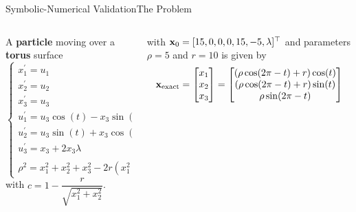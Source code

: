 \begin{frame}{Symbolic-Numerical Validation}{The Problem}
  \begin{columns}
    \begin{column}[t]{0.425\textwidth}
      A \textbf{particle} moving over a \textbf{torus} surface%
      \begin{equation*}
        \label{chap4:eq:torus}
        \begin{cases}
          x^{\prime}_{1} = u_{1} \\
          x^{\prime}_{2} = u_{2} \\
          x^{\prime}_{3} = u_{3} \\
          u^{\prime}_{1} = u_{3}\cos(t) - x_{3}\sin(t) - u_{2} + 2 c x_{1}\lambda \\
          u^{\prime}_{2} = u_{3}\sin(t) + x_{3}\cos(t) + u_{1} + 2 c x_{2}\lambda \\
          u^{\prime}_{3} = x_{3} + 2x_{3}\lambda \\
          \rho^2 = x_{1}^2 + x_{2}^2 + x_{3}^2 - 2r(x_{1}^2 + x_{2}^2)^{1/2} + r^2
        \end{cases}
      \end{equation*}
      with $c = 1 - \dfrac{r}{\sqrt{x_{1}^2 + x_{2}^2}}$.
    \end{column}
    \begin{column}[t]{0.575\textwidth}
      \vspace{-3.0em}
      with $\mathbf{x}_{0} = [15, 0, 0, 0, 15, -5, \lambda]^{\top}$ and parameters $\rho = 5$ and $r = 10$ is given by
      \begin{equation*}
        \mathbf{x}_\text{exact} = \begin{bmatrix}
          x_{1} \\ x_{2} \\ x_{3}
        \end{bmatrix} = \begin{bmatrix}
          (\rho \cos(2\pi - t) + r) \cos(t) \\
          (\rho \cos(2\pi - t) + r) \sin(t) \\
          \rho \sin(2\pi - t)
        \end{bmatrix}
      \end{equation*} \\[-3.0em]
      \centering{
        \begin{tikzpicture}
          \begin{axis}[
            xtick=\empty, ytick=\empty, ztick=\empty,
            axis line style={draw=none},
            tick style={draw=none},
            axis equal,
            view={100}{40}]

\end{axis}
\end{tikzpicture}}
\end{column}
\end{columns}
\end{frame}
